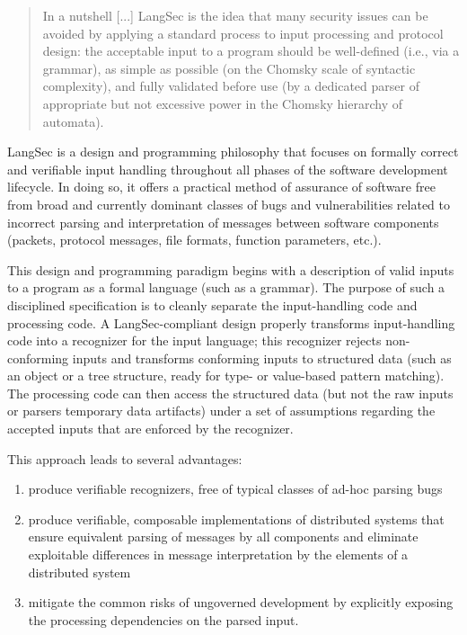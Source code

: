\documentclass{svproc}
\begin{document}
\blockquote{In a nutshell [...] LangSec is the idea that many security
  issues can be avoided by applying a standard process to input
  processing and protocol design: the acceptable input to a program
  should be well-defined (i.e., via a grammar), as simple as possible
  (on the Chomsky scale of syntactic complexity), and fully validated
  before use (by a dedicated parser of appropriate but not excessive
  power in the Chomsky hierarchy of
  automata). \cite{DBLP:conf/secdev/MomotBHP16} }

LangSec is a design and programming philosophy that focuses on
formally correct and verifiable input handling throughout all phases
of the software development lifecycle. In doing so, it offers a
practical method of assurance of software free from broad and
currently dominant classes of bugs and vulnerabilities related to
incorrect parsing and interpretation of messages between software
components (packets, protocol messages, file formats, function
parameters, etc.).

This design and programming paradigm begins with a description of
valid inputs to a program as a formal language (such as a
grammar). The purpose of such a disciplined specification is to
cleanly separate the input-handling code and processing code. A
LangSec-compliant design properly transforms input-handling code into
a recognizer for the input language; this recognizer rejects
non-conforming inputs and transforms conforming inputs to structured
data (such as an object or a tree structure, ready for type- or
value-based pattern matching). The processing code can then access the
structured data (but not the raw inputs or parsers temporary data
artifacts) under a set of assumptions regarding the accepted inputs
that are enforced by the recognizer.

This approach leads to several advantages:
\begin{enumerate}
\item produce verifiable recognizers, free of typical classes of ad-hoc parsing bugs
\item produce verifiable, composable implementations of distributed systems that ensure equivalent parsing of messages by all components and eliminate exploitable differences in message interpretation by the elements of a distributed system
\item mitigate the common risks of ungoverned development by
  explicitly exposing the processing dependencies on the parsed input.
\end{enumerate}
\end{document}
